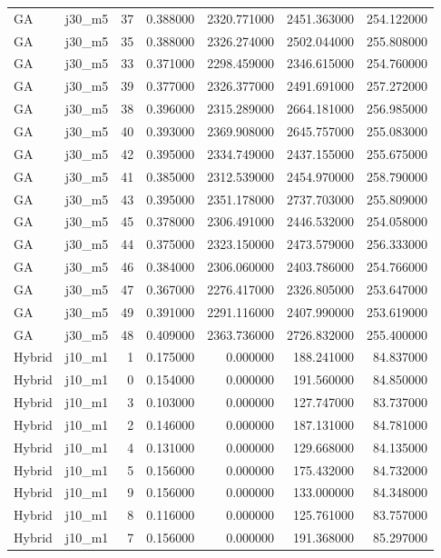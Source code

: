 \begin{tabular}{llrrrrr}
GA & j30_m5 & 37 & 0.388000 & 2320.771000 & 2451.363000 & 254.122000 \\
GA & j30_m5 & 35 & 0.388000 & 2326.274000 & 2502.044000 & 255.808000 \\
GA & j30_m5 & 33 & 0.371000 & 2298.459000 & 2346.615000 & 254.760000 \\
GA & j30_m5 & 39 & 0.377000 & 2326.377000 & 2491.691000 & 257.272000 \\
GA & j30_m5 & 38 & 0.396000 & 2315.289000 & 2664.181000 & 256.985000 \\
GA & j30_m5 & 40 & 0.393000 & 2369.908000 & 2645.757000 & 255.083000 \\
GA & j30_m5 & 42 & 0.395000 & 2334.749000 & 2437.155000 & 255.675000 \\
GA & j30_m5 & 41 & 0.385000 & 2312.539000 & 2454.970000 & 258.790000 \\
GA & j30_m5 & 43 & 0.395000 & 2351.178000 & 2737.703000 & 255.809000 \\
GA & j30_m5 & 45 & 0.378000 & 2306.491000 & 2446.532000 & 254.058000 \\
GA & j30_m5 & 44 & 0.375000 & 2323.150000 & 2473.579000 & 256.333000 \\
GA & j30_m5 & 46 & 0.384000 & 2306.060000 & 2403.786000 & 254.766000 \\
GA & j30_m5 & 47 & 0.367000 & 2276.417000 & 2326.805000 & 253.647000 \\
GA & j30_m5 & 49 & 0.391000 & 2291.116000 & 2407.990000 & 253.619000 \\
GA & j30_m5 & 48 & 0.409000 & 2363.736000 & 2726.832000 & 255.400000 \\
Hybrid & j10_m1 & 1 & 0.175000 & 0.000000 & 188.241000 & 84.837000 \\
Hybrid & j10_m1 & 0 & 0.154000 & 0.000000 & 191.560000 & 84.850000 \\
Hybrid & j10_m1 & 3 & 0.103000 & 0.000000 & 127.747000 & 83.737000 \\
Hybrid & j10_m1 & 2 & 0.146000 & 0.000000 & 187.131000 & 84.781000 \\
Hybrid & j10_m1 & 4 & 0.131000 & 0.000000 & 129.668000 & 84.135000 \\
Hybrid & j10_m1 & 5 & 0.156000 & 0.000000 & 175.432000 & 84.732000 \\
Hybrid & j10_m1 & 9 & 0.156000 & 0.000000 & 133.000000 & 84.348000 \\
Hybrid & j10_m1 & 8 & 0.116000 & 0.000000 & 125.761000 & 83.757000 \\
Hybrid & j10_m1 & 7 & 0.156000 & 0.000000 & 191.368000 & 85.297000 \\

\end{tabular}
